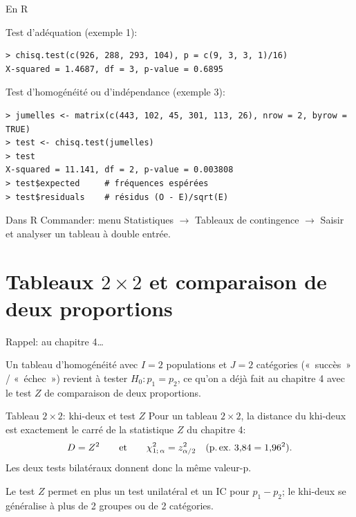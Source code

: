 \documentclass{BeamerTemplate}
\begin{document}
\begin{frame}[fragile,t]{En R}

Test d'adéquation (exemple 1):
\begin{Verbatim}[fontsize=\scriptsize]
> chisq.test(c(926, 288, 293, 104), p = c(9, 3, 3, 1)/16)
X-squared = 1.4687, df = 3, p-value = 0.6895
\end{Verbatim}

Test d'homogénéité ou d'indépendance (exemple 3):
\begin{Verbatim}[fontsize=\scriptsize]
> jumelles <- matrix(c(443, 102, 45, 301, 113, 26), nrow = 2, byrow = TRUE)
> test <- chisq.test(jumelles)
> test
X-squared = 11.141, df = 2, p-value = 0.003808
> test$expected     # fréquences espérées
> test$residuals    # résidus (O - E)/sqrt(E)
\end{Verbatim}

\small
Dans R Commander: menu \textsf{Statistiques} $\rightarrow$ \textsf{Tableaux de
contingence} $\rightarrow$ \textsf{Saisir et analyser un tableau à double entrée}.

\end{frame}

\section{Tableaux $2\times2$ et comparaison de deux proportions}

\begin{frame}[t]{Rappel: au chapitre 4\ldots}

Un tableau d'homogénéité avec $I=2$ populations et $J=2$ catégories
(«~succès~» / «~échec~») revient à tester $H_0: p_1=p_2$,
ce qu'on a déjà fait au chapitre 4 avec le test $Z$ de comparaison de deux
proportions.

\begin{Boite}{Tableau $2\times2$: khi-deux et test $Z$}
Pour un tableau $2\times2$, la distance du khi-deux est exactement le carré de
la statistique $Z$ du chapitre 4:
\[
D=Z^2 \qquad\text{et}\qquad \chi^2_{1;\,\alpha}=z_{\alpha/2}^2
\quad(\text{p.\,ex.\ } 3{,}84=1{,}96^2).
\]
Les deux tests bilatéraux donnent donc \alert{la même valeur-p}.
\end{Boite}

\small
Le test $Z$ permet en plus un test \alert{unilatéral} et un IC pour $p_1-p_2$; le
khi-deux se généralise à plus de 2 groupes ou de 2 catégories.

\end{frame}
\end{document}
